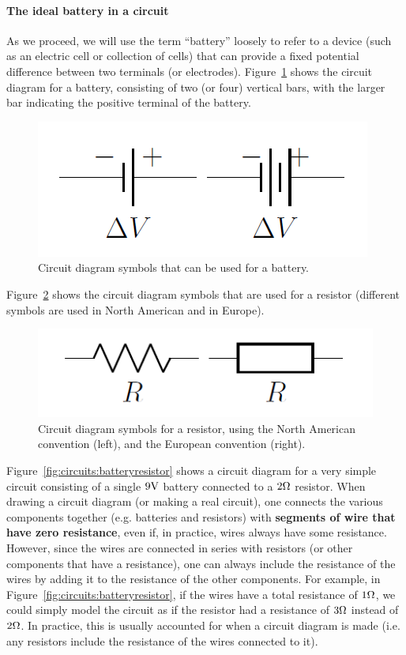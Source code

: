\paragraph{The ideal battery in a circuit}

As we proceed, we will use the term ``battery'' loosely to refer to a device (such as an electric cell or collection of cells) that can provide a fixed potential difference between two terminals (or electrodes). Figure~\ref{fig:circuits:batterysymbol} shows the circuit diagram for a battery, consisting of two (or four) vertical bars, with the larger bar indicating the positive terminal of the battery.

\begin{figure}[!htbp]
\centering
\includegraphics[width=0.6\linewidth]{files/batterysymbol-274afa3da108a9466ac4272b2cd962c5.png}
\caption[]{Circuit diagram symbols that can be used for a battery.}
\label{fig:circuits:batterysymbol}
\end{figure}

Figure~\ref{fig:circuits:resistorsymbol} shows the circuit diagram symbols that are used for a resistor (different symbols are used in North American and in Europe).

\begin{figure}[!htbp]
\centering
\includegraphics[width=0.6\linewidth]{files/resistorsymbol-cdfd7783ebc9bea4d3ca2eec6411d202.png}
\caption[]{Circuit diagram symbols for a resistor, using the North American convention (left), and the European convention (right).}
\label{fig:circuits:resistorsymbol}
\end{figure}

Figure~\ref{fig:circuits:batteryresistor} shows a circuit diagram for a very simple circuit consisting of a single $9 {\rm V}$ battery connected to a $2 {\rm \Omega}$ resistor. When drawing a circuit diagram (or making a real circuit), one connects the various components together (e.g. batteries and resistors) with \textbf{segments of wire that have zero resistance}, even if, in practice, wires always have some resistance. However, since the wires are connected in series with resistors (or other components that have a resistance), one can always include the resistance of the wires by adding it to the resistance of the other components. For example, in Figure~\ref{fig:circuits:batteryresistor}, if the wires have a total resistance of $1 {\rm \Omega}$, we could simply model the circuit as if the resistor had a resistance of $3 {\rm \Omega}$ instead of $2 {\rm \Omega}$. In practice, this is usually accounted for when a circuit diagram is made (i.e. any resistors include the resistance of the wires connected to it).

